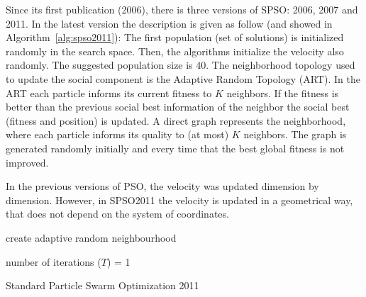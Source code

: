 \documentclass{article}
\begin{document}
    Since its first publication (2006), there is three versions of SPSO: 2006, 2007 and 2011.
    In the latest version the description is given as follow (and showed in Algorithm~\ref{alg:spso2011}):
    The first population (set of solutions) is initialized randomly in the search space. Then, the algorithms initialize the velocity also randomly. The suggested population size is $40$. The neighborhood topology used to update the social component is the Adaptive Random Topology (ART).
    In the ART each particle informs its current fitness to $K$ neighbors. If the fitness is better than the previous social best information of the neighbor the social best (fitness and position) is updated. A direct graph represents the neighborhood, where each particle informs its quality to (at most) $K$ neighbors. The graph is generated randomly initially and every time that the best global fitness is not improved.

    In the previous versions of PSO, the velocity was updated dimension by dimension.
    However, in SPSO2011 the velocity is updated in a geometrical way,  that does not depend on the system of coordinates.

    \begin{algorithm}[H]
        
        create adaptive random neighbourhood\;

        number of iterations ($T$) = 1\;
        
        \caption{Standard Particle Swarm Optimization 2011}
        \label{alg:spso2011}
    \end{algorithm}
\end{document}
